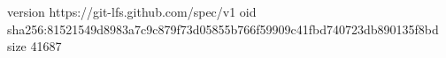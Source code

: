 version https://git-lfs.github.com/spec/v1
oid sha256:81521549d8983a7c9c879f73d05855b766f59909c41fbd740723db890135f8bd
size 41687
